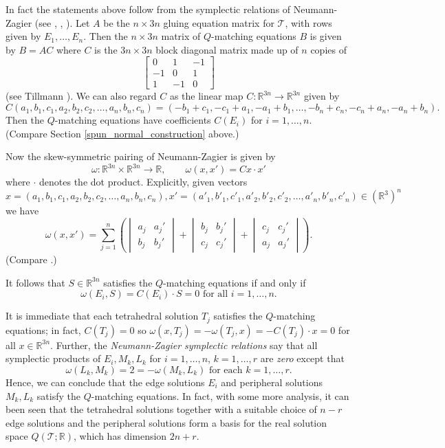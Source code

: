 \documentclass[12pt,reqno]{amsart}  %
\theoremstyle{definition}
\theoremstyle{remark}
\def\R{\mathbb{R}}
\def\tri{\mathcal{T}}
\def\be{  \begin{equation} }
\def\ee{  \end{equation} }
\newcommand{\T}{\mathcal{T}}
\begin{document}
In fact the statements above follow from the symplectic relations of 
Neumann-Zagier (see \cite{NZ}, \cite{N}, \cite{Choi}). Let $A$ be the 
$n \times 3n$ gluing equation matrix for $\tri$, with rows given by 
$E_1, \ldots, E_n$. Then the $n \times 3n$ matrix of $Q$-matching equations 
$B$ is given by $B=AC$  where $C$ is the $3n \times 3n$ block diagonal 
matrix made up of $n$ copies of
$$
\begin{bmatrix} 0 & 1 & -1 \\ -1 & 0 & 1 \\ 1 & -1 & 0\end{bmatrix}
$$
(see Tillmann \cite{Ti}). We can also regard $C$ as the linear map 
$C: \R^{3n} \to \R^{3n}$
given by
$$
C(a_1, b_1, c_1, a_2, b_2, c_2, \ldots , a_n, b_n, c_n) 
= (-b_1+c_1, -c_1+a_1,-a_1+b_1, \ldots, -b_n+c_n, -c_n+a_n,-a_n+b_n).
$$
Then the $Q$-matching equations have coefficients $C(E_i)$ for 
$i=1, \ldots , n$. (Compare Section \ref{spun_normal_construction} above.)

Now the skew-symmetric pairing of Neumann-Zagier 
is given by
$$
\omega : \R^{3n} \times \R^{3n} \to \R, \qquad %
\omega(x,x') = Cx \cdot x'
$$
where $\cdot$ denotes the dot product. Explicitly, given vectors 
$$
x=(a_1, b_1, c_1, a_2, b_2, c_2, \ldots , a_n, b_n, c_n), 
x'=(a'_1, b'_1, c'_1, a'_2, b'_2, c'_2, \ldots , a'_n, b'_n, c'_n) 
\in   (\R^3)^n
$$
we have
$$
\omega(x,x') = \sum_{j=1}^n  \left(  
\begin{vmatrix} a_j & a_j' \\ b_j & b_j' \end{vmatrix} +  
\begin{vmatrix} b_j& b_j' \\ c_j & c_j' \end{vmatrix} +   
\begin{vmatrix} c_j& c_j' \\ a_j & a_j' \end{vmatrix}\right) .
$$
(Compare \cite{N,Choi}.)

It follows that $S \in \R^{3n}$ satisfies the $Q$-matching equations if 
and only if 
\be 
\label{Qmatch}
\omega(E_i,S) = C(E_i) \cdot S = 0 \text{ for all } i = 1, \ldots ,n.
\ee

It is immediate that each tetrahedral solution $T_j$ satisfies the 
$Q$-matching equations; in fact,  $C(T_j)=0$ so 
$\omega(x,T_j)= -\omega(T_j,x) = -C(T_j) \cdot x = 0$ for all $x \in \R^{3n}$.
Further, the {\em Neumann-Zagier symplectic relations}  say that all 
symplectic products of $E_i, M_k, L_k$ for $i=1,\ldots, n$, 
$k=1,\ldots,r$ are {\em zero} except that
$$
\omega(L_k,M_k) = 2 = -\omega(M_k,L_k)  \text{ for each }k=1, \ldots , r .
$$
Hence, we can conclude that the edge solutions $E_i$ and peripheral 
solutions $M_k,L_k$ satisfy the $Q$-matching equations.  
In  fact, with some more analysis, it can been seen that the tetrahedral 
solutions together with  a suitable choice of $n-r$ edge solutions  and 
the peripheral solutions form a basis for the real solution space $Q(\T;\R)$,
which has dimension $2n+r$.
\end{document}
